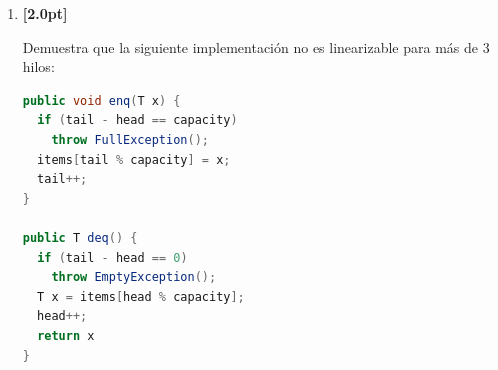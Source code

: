 \documentclass[a4paper,11pt]{article}
\begin{document}
\begin{enumerate}
    \item
    \textbf{[2.0pt]} 
    
    Demuestra que la siguiente implementación no es linearizable para más de 3 hilos:
    \begin{tcolorbox}
\begin{lstlisting}[language = JAVA]
public void enq(T x) {
  if (tail - head == capacity)
    throw FullException();
  items[tail % capacity] = x;
  tail++;
}

public T deq() {
  if (tail - head == 0)
    throw EmptyException();
  T x = items[head % capacity];
  head++;
  return x
}

\end{lstlisting}
\end{tcolorbox}






\end{enumerate}
\end{document}
